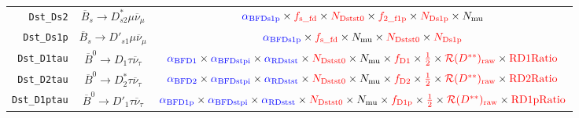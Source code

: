 \begin{landscape}
\begin{table}
\begin{tabular}{r|c|c}
     \texttt{Dst\_Ds2} &           $\overline{B}_s \rightarrow D_{s2}^* \mu \overline{\nu}_\mu$            &                                                                                  $\textcolor{blue}{\alpha_\text{BFDs1p}} \times \textcolor{red}{f_\text{s\_fd}} \times \textcolor{red}{N_\text{Dstst0}} \times \textcolor{red}{f_\text{2\_f1p}} \times \textcolor{red}{N_\text{Ds1p}} \times N_\text{mu}$                                                                                  \\
    \texttt{Dst\_Ds1p} &            $\overline{B}_s \rightarrow D'_{s1} \mu \overline{\nu}_\mu$            &                                                                                                      $\textcolor{blue}{\alpha_\text{BFDs1p}} \times \textcolor{red}{f_\text{s\_fd}} \times N_\text{mu} \times \textcolor{red}{N_\text{Dstst0}} \times \textcolor{red}{N_\text{Ds1p}}$                                                                                                      \\
   \texttt{Dst\_D1tau} &             $\overline{B}^0 \rightarrow D_1 \tau \overline{\nu}_\tau$             &           $\textcolor{blue}{\alpha_\text{BFD1}} \times \textcolor{blue}{\alpha_\text{BFDstpi}} \times \textcolor{blue}{\alpha_\text{RDstst}} \times \textcolor{red}{N_\text{Dstst0}} \times N_\text{mu} \times \textcolor{red}{f_\text{D1}} \times \textcolor{red}{\frac{1}{2}} \times \textcolor{red}{\mathcal{R}(D^{**})_\text{raw}} \times \textcolor{red}{\text{RD1Ratio}}$            \\
   \texttt{Dst\_D2tau} &            $\overline{B}^0 \rightarrow D^*_2 \tau \overline{\nu}_\tau$            &           $\textcolor{blue}{\alpha_\text{BFD2}} \times \textcolor{blue}{\alpha_\text{BFDstpi}} \times \textcolor{blue}{\alpha_\text{RDstst}} \times \textcolor{red}{N_\text{Dstst0}} \times N_\text{mu} \times \textcolor{red}{f_\text{D2}} \times \textcolor{red}{\frac{1}{2}} \times \textcolor{red}{\mathcal{R}(D^{**})_\text{raw}} \times \textcolor{red}{\text{RD2Ratio}}$            \\
  \texttt{Dst\_D1ptau} &            $\overline{B}^0 \rightarrow D'_1 \tau \overline{\nu}_\tau$             &          $\textcolor{blue}{\alpha_\text{BFD1p}} \times \textcolor{blue}{\alpha_\text{BFDstpi}} \times \textcolor{blue}{\alpha_\text{RDstst}} \times \textcolor{red}{N_\text{Dstst0}} \times N_\text{mu} \times \textcolor{red}{f_\text{D1p}} \times \textcolor{red}{\frac{1}{2}} \times \textcolor{red}{\mathcal{R}(D^{**})_\text{raw}} \times \textcolor{red}{\text{RD1pRatio}}$          \\

\end{tabular}
\end{table}
\end{landscape}
